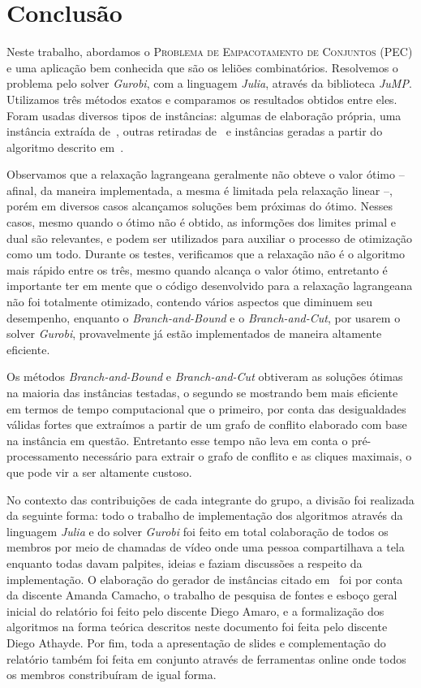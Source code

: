 \documentclass{article}
\begin{document}
    
	\section{Conclusão}\label{sec:concl}
	Neste trabalho, abordamos o \textsc{Problema de Empacotamento de Conjuntos} (PEC) e uma aplicação bem conhecida que são os leliões combinatórios. Resolvemos o problema pelo solver \emph{Gurobi}, com a linguagem \emph{Julia}, através da biblioteca \emph{JuMP}. Utilizamos três métodos exatos e comparamos os resultados obtidos entre eles. Foram usadas diversos tipos de instâncias: algumas de elaboração própria, uma instância extraída de~\cite{Elisa}, outras retiradas de~\cite{benchmarks} e instâncias geradas a partir do algoritmo descrito em~\cite{guo2005using}. 
	
	Observamos que a relaxação lagrangeana geralmente não obteve o valor ótimo -- afinal, da maneira implementada, a mesma é limitada pela relaxação linear --, porém em diversos casos alcançamos soluções bem próximas do ótimo. Nesses casos, mesmo quando o ótimo não é obtido, as informções dos limites primal e dual são relevantes, e podem ser utilizados para auxiliar o processo de otimização como um todo. Durante os testes, verificamos que a relaxação não é o algoritmo mais rápido entre os três, mesmo quando alcança o valor ótimo, entretanto é importante ter em mente que o código desenvolvido para a relaxação lagrangeana não foi totalmente otimizado, contendo vários aspectos que diminuem seu desempenho, enquanto o \emph{Branch-and-Bound} e o \emph{Branch-and-Cut}, por usarem o solver \emph{Gurobi}, provavelmente já estão implementados de maneira altamente eficiente.
	
	Os métodos \emph{Branch-and-Bound} e \emph{Branch-and-Cut} obtiveram as soluções ótimas na maioria das instâncias testadas, o segundo se mostrando bem mais eficiente em termos de tempo computacional que o primeiro, por conta das desigualdades válidas fortes que extraímos a partir de um grafo de conflito elaborado com base na instância em questão. Entretanto esse tempo não leva em conta o pré-processamento necessário para extrair o grafo de conflito e as cliques maximais, o que pode vir a ser altamente custoso.
	
	No contexto das contribuições de cada integrante do grupo, a divisão foi realizada da seguinte forma: todo o trabalho de implementação dos algoritmos através da linguagem \emph{Julia} e do solver \emph{Gurobi} foi feito em total colaboração de todos os membros por meio de chamadas de vídeo onde uma pessoa compartilhava a tela enquanto todas davam palpites, ideias e faziam discussões a respeito da implementação. O elaboração do gerador de instâncias citado em~\cite{guo2005using} foi por conta da discente Amanda Camacho, o trabalho de pesquisa de fontes e esboço geral inicial do relatório foi feito pelo discente Diego Amaro, e a formalização dos algoritmos na forma teórica descritos neste documento foi feita pelo discente Diego Athayde. Por fim, toda a apresentação de slides e complementação do relatório também foi feita em conjunto através de ferramentas online onde todos os membros constribuíram de igual forma.
	
\end{document}
